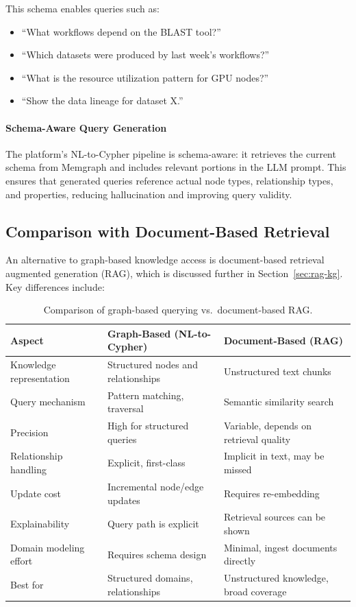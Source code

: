 \documentclass[a4paper,twoside]{sapthesis}
\begin{document}
This schema enables queries such as:
\begin{itemize}
    \item ``What workflows depend on the BLAST tool?''
    \item ``Which datasets were produced by last week's workflows?''
    \item ``What is the resource utilization pattern for GPU nodes?''
    \item ``Show the data lineage for dataset X.''
\end{itemize}

\paragraph{Schema-Aware Query Generation}

The platform's NL-to-Cypher pipeline is schema-aware: it retrieves the current schema from Memgraph and includes relevant portions in the LLM prompt. This ensures that generated queries reference actual node types, relationship types, and properties, reducing hallucination and improving query validity.

\subsection{Comparison with Document-Based Retrieval}

An alternative to graph-based knowledge access is document-based retrieval augmented generation (RAG), which is discussed further in Section~\ref{sec:rag-kg}. Key differences include:

\begin{table}[ht]
\centering
\caption{Comparison of graph-based querying vs.\ document-based RAG.}
\label{tab:graph-vs-rag}
\small
\begin{tabularx}{\textwidth}{l>{\raggedright\arraybackslash}X>{\raggedright\arraybackslash}X}
\hline
\textbf{Aspect} & \textbf{Graph-Based (NL-to-Cypher)} & \textbf{Document-Based (RAG)} \\
\midrule
Knowledge representation & Structured nodes and relationships & Unstructured text chunks \\
Query mechanism & Pattern matching, traversal & Semantic similarity search \\
Precision & High for structured queries & Variable, depends on retrieval quality \\
Relationship handling & Explicit, first-class & Implicit in text, may be missed \\
Update cost & Incremental node/edge updates & Requires re-embedding \\
Explainability & Query path is explicit & Retrieval sources can be shown \\
Domain modeling effort & Requires schema design & Minimal, ingest documents directly \\
Best for & Structured domains, relationships & Unstructured knowledge, broad coverage \\
\midrule
\end{tabularx}
\end{table}
\end{document}
